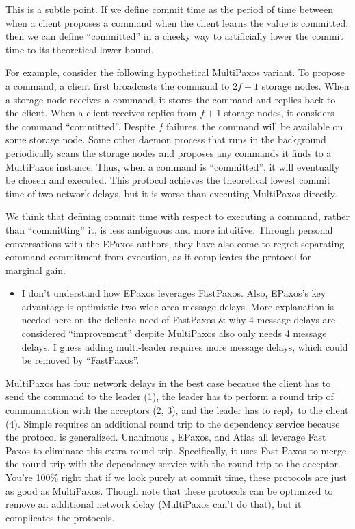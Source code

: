 \documentclass[letterpaper,twocolumn,10pt]{article}
\newenvironment{reviewerquote}
{\list{}{\leftmargin=\parindent\rightmargin=0in}\item[] \itshape \color{ReviewerDarkGray}}%
{\endlist}
\begin{document}
This is a subtle point. If we define commit time as the period of time between
when a client proposes a command when the client learns the value is committed,
then we can define ``committed'' in a cheeky way to artificially lower the
commit time to its theoretical lower bound.

For example, consider the following hypothetical MultiPaxos variant. To propose
a command, a client first broadcasts the command to $2f+1$ storage nodes. When
a storage node receives a command, it stores the command and replies back to
the client. When a client receives replies from $f+1$ storage nodes, it
considers the command ``committed''. Despite $f$ failures, the command will be
available on some storage node. Some other daemon process that runs in the
background periodically scans the storage nodes and proposes any commands it
finds to a MultiPaxos instance. Thus, when a command is ``committed'', it will
eventually be chosen and executed. This protocol achieves the theoretical
lowest commit time of two network delays, but it is worse than executing
MultiPaxos directly.

We think that defining commit time with respect to executing a command, rather
than ``committing'' it, is less ambiguous and more intuitive. Through personal
conversations with the EPaxos authors, they have also come to regret separating
command commitment from execution, as it complicates the protocol for marginal
gain.

\begin{reviewerquote}
  \begin{itemize}
    \item
      I don't understand how EPaxos leverages FastPaxos. Also, EPaxos's key
      advantage is optimistic two wide-area message delays. More explanation is
      needed here on the delicate need of FastPaxos \& why 4 message delays are
      considered ``improvement'' despite MultiPaxos also only needs 4 message
      delays. I guess adding multi-leader requires more message delays, which
      could be removed by ``FastPaxos''.
  \end{itemize}
\end{reviewerquote}

MultiPaxos has four network delays in the best case because the client has to
send the command to the leader (1), the leader has to perform a round trip of
communication with the acceptors (2, 3), and the leader has to reply to the
client (4). Simple \BPaxos{} requires an additional round trip to the
dependency service because the protocol is generalized. Unanimous \BPaxos{},
EPaxos, and Atlas all leverage Fast Paxos to eliminate this extra round trip.
Specifically, it uses Fast Paxos to merge the round trip with the dependency
service with the round trip to the acceptor.  You're 100\% right that if we
look purely at commit time, these protocols are just as good as MultiPaxos.
Though note that these protocols can be optimized to remove an additional
network delay (MultiPaxos can't do that), but it complicates the protocols.
\end{document}
